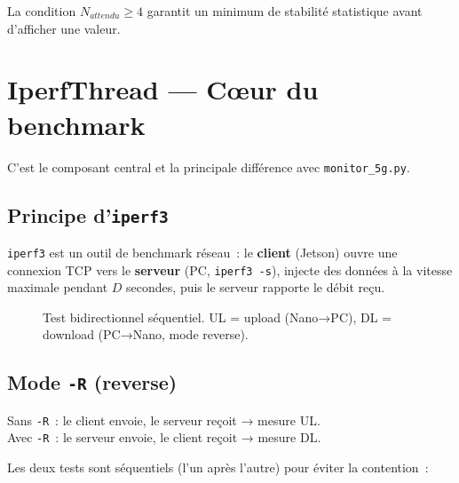 \documentclass[a4paper,12pt]{article}
\begin{document}
La condition $N_{attendu} \geq 4$ garantit un minimum de stabilité statistique avant
d'afficher une valeur.

\section{IperfThread — Cœur du benchmark}

C'est le composant central et la principale différence avec \texttt{monitor\_5g.py}.

\subsection{Principe d'\texttt{iperf3}}

\texttt{iperf3} est un outil de benchmark réseau~: le \textbf{client} (Jetson) ouvre
une connexion TCP vers le \textbf{serveur} (PC, \texttt{iperf3 -s}), injecte des données
à la vitesse maximale pendant $D$ secondes, puis le serveur rapporte le débit reçu.

\begin{figure}[H]
\centering
{}
\caption{Test bidirectionnel séquentiel. UL = upload (Nano→PC), DL = download (PC→Nano, mode reverse).}
\end{figure}

\subsection{Mode \texttt{-R} (reverse)}

Sans \texttt{-R}~: le client envoie, le serveur reçoit → mesure UL.\\
Avec \texttt{-R}~: le serveur envoie, le client reçoit → mesure DL.

Les deux tests sont séquentiels (l'un après l'autre) pour éviter la contention~:
\end{document}
